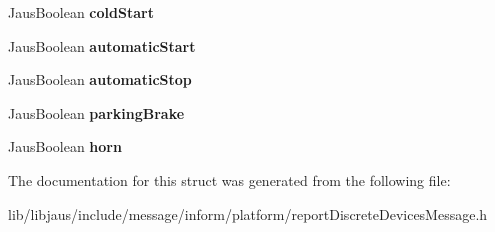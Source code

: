 \begin{DoxyCompactItemize}
\item 
\hypertarget{struct_report_discrete_devices_message_struct_a04b1fb2342e7a0fc30dd922f086a6c55}{\-Jaus\-Boolean {\bfseries cold\-Start}}\label{struct_report_discrete_devices_message_struct_a04b1fb2342e7a0fc30dd922f086a6c55}

\item 
\hypertarget{struct_report_discrete_devices_message_struct_a8cfeefbf78febe8991c6549265923f8d}{\-Jaus\-Boolean {\bfseries automatic\-Start}}\label{struct_report_discrete_devices_message_struct_a8cfeefbf78febe8991c6549265923f8d}

\item 
\hypertarget{struct_report_discrete_devices_message_struct_a2ed530bb043329524812900572eb2d59}{\-Jaus\-Boolean {\bfseries automatic\-Stop}}\label{struct_report_discrete_devices_message_struct_a2ed530bb043329524812900572eb2d59}

\item 
\hypertarget{struct_report_discrete_devices_message_struct_a36bbdcd3b5e9dd675b7f02e1eb9b00d9}{\-Jaus\-Boolean {\bfseries parking\-Brake}}\label{struct_report_discrete_devices_message_struct_a36bbdcd3b5e9dd675b7f02e1eb9b00d9}

\item 
\hypertarget{struct_report_discrete_devices_message_struct_a49c4a339861e3f2e240a3870655637b9}{\-Jaus\-Boolean {\bfseries horn}}\label{struct_report_discrete_devices_message_struct_a49c4a339861e3f2e240a3870655637b9}

\end{DoxyCompactItemize}


\-The documentation for this struct was generated from the following file\-:\begin{DoxyCompactItemize}
\item 
lib/libjaus/include/message/inform/platform/report\-Discrete\-Devices\-Message.\-h\end{DoxyCompactItemize}
